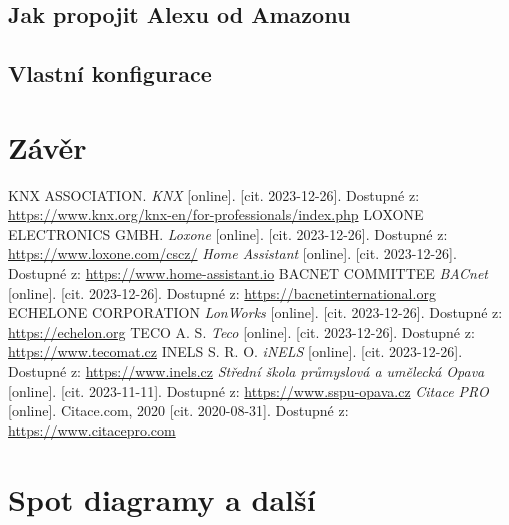 \documentclass[12pt, a4paper,
twoside,        %
openright
]{report}
\begin{document}
\section[Propojení]{Jak propojit Alexu od Amazonu}
\section{Vlastní konfigurace}
	
\chapter*{Závěr}

	\begin{thebibliography}{99}
		KNX ASSOCIATION. \textit{KNX} [online]. [cit. 2023-12-26]. Dostupné z: \url{https://www.knx.org/knx-en/for-professionals/index.php}
		 LOXONE ELECTRONICS GMBH. \textit{Loxone} [online]. [cit. 2023-12-26]. Dostupné z: \url{https://www.loxone.com/cscz/}
		 \textit{Home Assistant} [online]. [cit. 2023-12-26]. Dostupné z: \url{https://www.home-assistant.io}
		 BACNET COMMITTEE \textit{BACnet} [online]. [cit. 2023-12-26]. Dostupné z: \url{https://bacnetinternational.org}
		 ECHELONE CORPORATION \textit{LonWorks} [online]. [cit. 2023-12-26]. Dostupné z: \url{https://echelon.org}
		 TECO A. S. \textit{Teco} [online]. [cit. 2023-12-26]. Dostupné z: \url{https://www.tecomat.cz}
		 INELS S. R. O. \textit{iNELS} [online]. [cit. 2023-12-26]. Dostupné z: \url{https://www.inels.cz}
		 \textit{Střední škola průmyslová a umělecká Opava} [online]. [cit. 2023-11-11]. Dostupné z: \url{https://www.sspu-opava.cz}
		\textit{Citace PRO} [online]. Citace.com, 2020 [cit. 2020-08-31]. Dostupné z: \url{https://www.citacepro.com}
	\end{thebibliography}
	
	\listoffigures
	
	\listoftables
	
	\appendix %
	
	[\vspace{-22pt}] %
	
	
	\chapter{%
		Spot diagramy a další }
	
	
\end{document}

